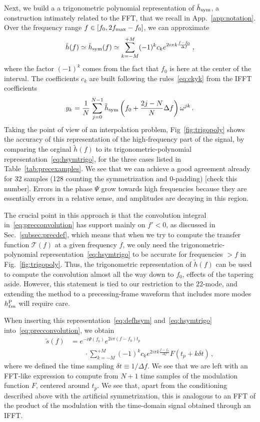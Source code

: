 \documentclass[aps,showpacs,twocolumn,
prd,superscriptaddress,nofootinbib]{revtex4-1}
\newcommand{\be}{\begin{equation}}
\newcommand{\ee}{\end{equation}}
\newcommand\calT{{\mathcal{T}}}
\newcommand{\nn}{\nonumber}
\newcommand{\SM}[1]{{\color{Red} #1}}
\begin{document}
Next, we build a a trigonometric polynomial representation of $\tilde{h}_{\rm sym}$, a construction intimately related to the FFT, that we recall in App.~\ref{app:notation}. Over the frequency range $f\in [f_{0}, 2f_{\rm max} - f_{0}]$, we can approximate
\be\label{eq:hsymtrigo}
	\tilde{h}(f) \simeq \tilde{h}_{\rm sym } (f) \simeq \sum\limits_{k=-M}^{+M} (-1)^{k} c_{k} e^{2i\pi k \frac{f-f_{0}}{\Delta f}} \,,
\ee
where the factor $(-1)^{k}$ comes from the fact that $f_{0}$ is here at the center of the interval. The coefficients $c_{k}$ are built following the rules~\eqref{eq:ckyk} from the IFFT coefficients
\be\label{eq:ykDFTprec}
	y_{k} = \frac{1}{N} \sum\limits_{j=0}^{N-1} \tilde{h}_{\rm sym}\left( f_{0} + \frac{2j - N}{N} \Delta f \right) \omega^{jk} \,.
\ee
Taking the point of view of an interpolation problem, Fig~\ref{fig:trigopoly} shows the accuracy of this representation of the high-frequency part of the signal, by comparing the orginal $\tilde{h}(f)$ to its  trigonometric-polynomial representation~\eqref{eq:hsymtrigo}, for the three cases listed in Table~\ref{tab:precexamples}. We see that we can achieve a good agreement already for 32 samples (128 counting the symmetrization and 0-padding) \SM{[check this number]}. Errors in the phase $\Psi$ grow towards high frequencies because they are essentially errors in a relative sense, and amplitudes are decaying in this region.

The crucial point in this approach is that the convolution integral in~\eqref{eq:precconvolution} has support mainly on $f'<0$, as discussed in Sec.~\ref{subsec:precdef}, which means that when we try to compute the transfer function $\calT(f)$ at a given frequency $f$, we only need the trigonometric-polynomial representation~\eqref{eq:hsymtrigo} to be accurate for frequencies $>f$ in Fig.~\ref{fig:trigopoly}. Thus, the trigonometric representation of $\tilde{h}(f)$ can be used to compute the convolution almost all the way down to $f_{0}$, effects of the tapering aside. However, this statement is tied to our restriction to the $22$-mode, and extending the method to a precessing-frame waveform that includes more modes $h^{\rm P}_{\ell m}$ will require care.

When inserting this representation~\eqref{eq:defhsym} and~\eqref{eq:hsymtrigo} into~\eqref{eq:precconvolution}, we obtain
\begin{align}\label{eq:resultdirectconvol}
	\tilde{s}(f) &= e^{-i \Psi(f_{0})} e^{2i\pi (f-f_{0}) t_{p}} \nn\\
	& \qquad \cdot\sum\limits_{k=-M}^{+M} (-1)^{k} c_{k} e^{2i\pi k \frac{f-f_{0}}{\Delta f}} F(t_{p} + k\delta t) \,, 
\end{align}
where we defined the time sampling $\delta t \equiv 1/\Delta f$. We see that we are left with an FFT-like expression to compute from $N+1$ time samples of the modulation function $F$, centered around $t_{p}$. We see that, apart from the conditioning described above with the artificial symmetrization, this is analogous to an FFT of the product of the modulation with the time-domain signal obtained through an IFFT. 
\end{document}
